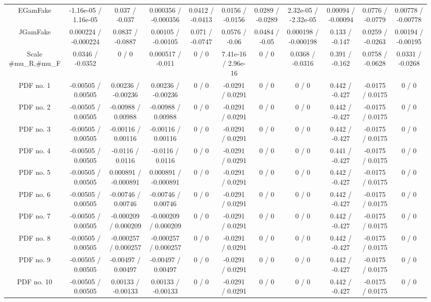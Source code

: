\begin{table}[htbp]
\begin{center}
\begin{tabular}{|c|c|c|c|c|c|c|c|c|c|c|}
  EGamFake & -1.16e-05 / 1.16e-05 & 0.037 / -0.037 & 0.000356 / -0.000356 & 0.0412 / -0.0413 & 0.0156 / -0.0156 & 0.0289 / -0.0289 & 2.32e-05 / -2.32e-05 & 0.00094 / -0.00094 & 0.0776 / -0.0779 & 0.00778 / -0.00778 \\ 
  JGamFake & 0.000224 / -0.000224 & 0.0837 / -0.0887 & 0.00105 / -0.00105 & 0.071 / -0.0747 & 0.0576 / -0.06 & 0.0484 / -0.05 & 0.000198 / -0.000198 & 0.133 / -0.147 & 0.0259 / -0.0263 & 0.00194 / -0.00195 \\ 
  Scale #mu_{R},#mu_{F} & 0.0346 / -0.0352 & 0 / 0 & 0.000517 / -0.011 & 0 / 0 & 7.41e-16 / 2.96e-16 & 0 / 0 & 0.0368 / -0.0316 & 0.391 / -0.162 & 0.0758 / -0.0628 & 0.0331 / -0.0268 \\ 
  PDF no. 1 & -0.00505 / 0.00505 & 0.00236 / -0.00236 & 0.00236 / -0.00236 & 0 / 0 & -0.0291 / 0.0291 & 0 / 0 & 0 / 0 & 0.442 / -0.427 & -0.0175 / 0.0175 & 0 / 0 \\ 
  PDF no. 2 & -0.00505 / 0.00505 & -0.00988 / 0.00988 & -0.00988 / 0.00988 & 0 / 0 & -0.0291 / 0.0291 & 0 / 0 & 0 / 0 & 0.442 / -0.427 & -0.0175 / 0.0175 & 0 / 0 \\ 
  PDF no. 3 & -0.00505 / 0.00505 & -0.00116 / 0.00116 & -0.00116 / 0.00116 & 0 / 0 & -0.0291 / 0.0291 & 0 / 0 & 0 / 0 & 0.442 / -0.427 & -0.0175 / 0.0175 & 0 / 0 \\ 
  PDF no. 4 & -0.00505 / 0.00505 & -0.0116 / 0.0116 & -0.0116 / 0.0116 & 0 / 0 & -0.0291 / 0.0291 & 0 / 0 & 0 / 0 & 0.441 / -0.427 & -0.0175 / 0.0175 & 0 / 0 \\ 
  PDF no. 5 & -0.00505 / 0.00505 & 0.000891 / -0.000891 & 0.000891 / -0.000891 & 0 / 0 & -0.0291 / 0.0291 & 0 / 0 & 0 / 0 & 0.442 / -0.427 & -0.0175 / 0.0175 & 0 / 0 \\ 
  PDF no. 6 & -0.00505 / 0.00505 & -0.00746 / 0.00746 & -0.00746 / 0.00746 & 0 / 0 & -0.0291 / 0.0291 & 0 / 0 & 0 / 0 & 0.442 / -0.427 & -0.0175 / 0.0175 & 0 / 0 \\ 
  PDF no. 7 & -0.00505 / 0.00505 & -0.000209 / 0.000209 & -0.000209 / 0.000209 & 0 / 0 & -0.0291 / 0.0291 & 0 / 0 & 0 / 0 & 0.442 / -0.427 & -0.0175 / 0.0175 & 0 / 0 \\ 
  PDF no. 8 & -0.00505 / 0.00505 & -0.000257 / 0.000257 & -0.000257 / 0.000257 & 0 / 0 & -0.0291 / 0.0291 & 0 / 0 & 0 / 0 & 0.442 / -0.427 & -0.0175 / 0.0175 & 0 / 0 \\ 
  PDF no. 9 & -0.00505 / 0.00505 & -0.00497 / 0.00497 & -0.00497 / 0.00497 & 0 / 0 & -0.0291 / 0.0291 & 0 / 0 & 0 / 0 & 0.442 / -0.427 & -0.0175 / 0.0175 & 0 / 0 \\ 
  PDF no. 10 & -0.00505 / 0.00505 & 0.00133 / -0.00133 & 0.00133 / -0.00133 & 0 / 0 & -0.0291 / 0.0291 & 0 / 0 & 0 / 0 & 0.442 / -0.427 & -0.0175 / 0.0175 & 0 / 0 \\ 

\end{tabular}
\end{center}
\end{table}
